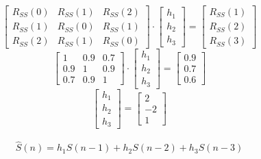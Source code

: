 \begin{equation*}
	\begin{bmatrix}
		R_{SS}(0) & R_{SS}(1) & R_{SS}(2) \\
		R_{SS}(1) & R_{SS}(0) & R_{SS}(1) \\
		R_{SS}(2) & R_{SS}(1) & R_{SS}(0) 
	\end{bmatrix}
	\cdot
	\begin{bmatrix}
		h_1 \\
		h_2 \\
		h_3 
	\end{bmatrix}
	=
	\begin{bmatrix}
		R_{SS}(1) \\
		R_{SS}(2) \\
		R_{SS}(3) 
	\end{bmatrix}
\end{equation*}	
\begin{equation*}
	\begin{bmatrix}
		1 & 0.9 & 0.7 \\
		0.9 & 1 & 0.9 \\
		0.7 & 0.9 & 1 
	\end{bmatrix}
	\cdot
	\begin{bmatrix}
		h_1 \\
		h_2 \\
		h_3 
	\end{bmatrix}
	=
	\begin{bmatrix}
		0.9 \\
		0.7 \\
		0.6
	\end{bmatrix}	
\end{equation*}
\begin{equation*}
\begin{bmatrix}
		h_1 \\
		h_2 \\
		h_3 
	\end{bmatrix}
	=
	\begin{bmatrix}
		2 \\
		-2 \\
		1
	\end{bmatrix}	
\end{equation*}

\begin{equation*}
\begin{gathered}
	\hat{S}(n) = h_1 S(n-1) + h_2 S(n-2) + h_3 S(n-3) 
\end{gathered}
\end{equation*}

\vspace{1cm}

